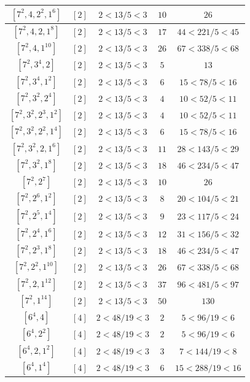 \documentclass{article}%
\begin{document}
\begin{center}
\begin{longtable}{||c|c|c|c|c||}
$[7^{2}, 4, 2^{2}, 1^{6}]$ & $[2]$ & $2 < 13/5 < 3$ & $10$ & $26$ \\ \hline 
$[7^{2}, 4, 2, 1^{8}]$ & $[2]$ & $2 < 13/5 < 3$ & $17$ & $44 < 221/5 < 45$ \\ \hline 
$[7^{2}, 4, 1^{10}]$ & $[2]$ & $2 < 13/5 < 3$ & $26$ & $67 < 338/5 < 68$ \\ \hline 
$[7^{2}, 3^{4}, 2]$ & $[2]$ & $2 < 13/5 < 3$ & $5$ & $13$ \\ \hline 
$[7^{2}, 3^{4}, 1^{2}]$ & $[2]$ & $2 < 13/5 < 3$ & $6$ & $15 < 78/5 < 16$ \\ \hline 
$[7^{2}, 3^{2}, 2^{4}]$ & $[2]$ & $2 < 13/5 < 3$ & $4$ & $10 < 52/5 < 11$ \\ \hline 
$[7^{2}, 3^{2}, 2^{3}, 1^{2}]$ & $[2]$ & $2 < 13/5 < 3$ & $4$ & $10 < 52/5 < 11$ \\ \hline 
$[7^{2}, 3^{2}, 2^{2}, 1^{4}]$ & $[2]$ & $2 < 13/5 < 3$ & $6$ & $15 < 78/5 < 16$ \\ \hline 
$[7^{2}, 3^{2}, 2, 1^{6}]$ & $[2]$ & $2 < 13/5 < 3$ & $11$ & $28 < 143/5 < 29$ \\ \hline 
$[7^{2}, 3^{2}, 1^{8}]$ & $[2]$ & $2 < 13/5 < 3$ & $18$ & $46 < 234/5 < 47$ \\ \hline 
$[7^{2}, 2^{7}]$ & $[2]$ & $2 < 13/5 < 3$ & $10$ & $26$ \\ \hline 
$[7^{2}, 2^{6}, 1^{2}]$ & $[2]$ & $2 < 13/5 < 3$ & $8$ & $20 < 104/5 < 21$ \\ \hline 
$[7^{2}, 2^{5}, 1^{4}]$ & $[2]$ & $2 < 13/5 < 3$ & $9$ & $23 < 117/5 < 24$ \\ \hline 
$[7^{2}, 2^{4}, 1^{6}]$ & $[2]$ & $2 < 13/5 < 3$ & $12$ & $31 < 156/5 < 32$ \\ \hline 
$[7^{2}, 2^{3}, 1^{8}]$ & $[2]$ & $2 < 13/5 < 3$ & $18$ & $46 < 234/5 < 47$ \\ \hline 
$[7^{2}, 2^{2}, 1^{10}]$ & $[2]$ & $2 < 13/5 < 3$ & $26$ & $67 < 338/5 < 68$ \\ \hline 
$[7^{2}, 2, 1^{12}]$ & $[2]$ & $2 < 13/5 < 3$ & $37$ & $96 < 481/5 < 97$ \\ \hline 
$[7^{2}, 1^{14}]$ & $[2]$ & $2 < 13/5 < 3$ & $50$ & $130$ \\ \hline 
$[6^{4}, 4]$ & $[4]$ & $2 < 48/19 < 3$ & $2$ & $5 < 96/19 < 6$ \\ \hline 
$[6^{4}, 2^{2}]$ & $[4]$ & $2 < 48/19 < 3$ & $2$ & $5 < 96/19 < 6$ \\ \hline 
$[6^{4}, 2, 1^{2}]$ & $[4]$ & $2 < 48/19 < 3$ & $3$ & $7 < 144/19 < 8$ \\ \hline 
$[6^{4}, 1^{4}]$ & $[4]$ & $2 < 48/19 < 3$ & $6$ & $15 < 288/19 < 16$ \\ \hline 

\end{longtable}
\end{center}
\end{document}
